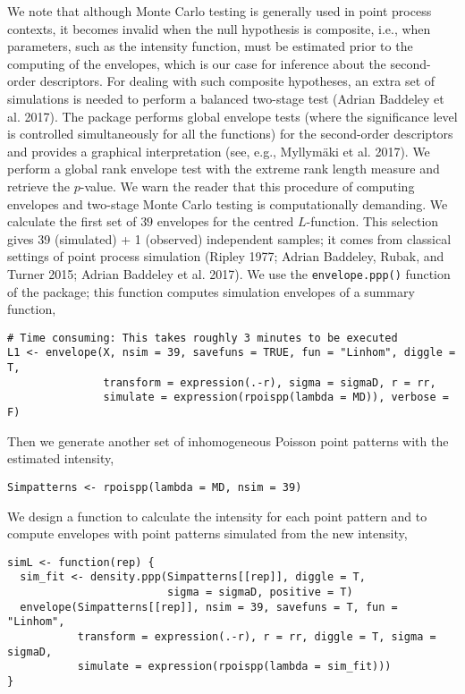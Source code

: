 We note that although Monte Carlo testing is generally used in point process contexts, it becomes invalid when the null hypothesis is composite, i.e., when parameters, such as the intensity function, must be estimated prior to the computing of the envelopes, which is our case for inference about the second-order descriptors. For dealing with such composite hypotheses, an extra set of simulations is needed to perform a balanced two-stage test (Adrian Baddeley et al. 2017). The  package performs global envelope tests (where the significance level is controlled simultaneously for all the functions) for the second-order descriptors and provides a graphical interpretation (see, e.g., Myllymäki et al. 2017). We perform a global rank envelope test with the extreme rank length measure and retrieve the \(p\)-value. We warn the reader that this procedure of computing envelopes and two-stage Monte Carlo testing is computationally demanding. We calculate the first set of \(39\) envelopes for the centred \(L\)-function. This selection gives 39 (simulated) + 1 (observed) independent samples; it comes from classical settings of point process simulation (Ripley 1977; Adrian Baddeley, Rubak, and Turner 2015; Adrian Baddeley et al. 2017). We use the \texttt{envelope.ppp()} function of the  package; this function computes simulation envelopes of a summary function,

\begin{verbatim}
# Time consuming: This takes roughly 3 minutes to be executed 
L1 <- envelope(X, nsim = 39, savefuns = TRUE, fun = "Linhom", diggle = T,
               transform = expression(.-r), sigma = sigmaD, r = rr, 
               simulate = expression(rpoispp(lambda = MD)), verbose = F)
\end{verbatim}

Then we generate another set of inhomogeneous Poisson point patterns with the estimated intensity,

\begin{verbatim}
Simpatterns <- rpoispp(lambda = MD, nsim = 39)
\end{verbatim}

We design a function to calculate the intensity for each point pattern and to compute envelopes with point patterns simulated from the new intensity,

\begin{verbatim}
simL <- function(rep) {
  sim_fit <- density.ppp(Simpatterns[[rep]], diggle = T, 
                         sigma = sigmaD, positive = T)
  envelope(Simpatterns[[rep]], nsim = 39, savefuns = T, fun = "Linhom", 
           transform = expression(.-r), r = rr, diggle = T, sigma = sigmaD,
           simulate = expression(rpoispp(lambda = sim_fit)))
}
\end{verbatim}

